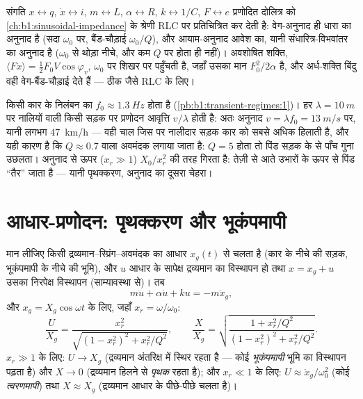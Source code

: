 \begin{remark}[दो अनुनाद, एक परिपथ]\label{rem:b1:oscillators-resonance:analogy}
संगति $x \leftrightarrow q$, $\dot x \leftrightarrow i$,
$m \leftrightarrow L$, $\alpha \leftrightarrow R$, $k \leftrightarrow 1/C$,
$F \leftrightarrow e$ प्रणोदित दोलित्र को \cref{ch:b1:sinusoidal-impedance}
के श्रेणी RLC पर प्रतिचित्रित कर देती है: वेग-अनुनाद ही धारा का अनुनाद है
(सदा $\omega_0$ पर, बैंड-चौड़ाई $\omega_0/Q$), और आयाम-अनुनाद आवेश का, यानी
संधारित्र-विभवांतर का अनुनाद है ($\omega_0$ से थोड़ा नीचे, और कम $Q$ पर
होता ही नहीं)। अवशोषित शक्ति, $\langle F\dot x\rangle
= \tfrac12 F_0V\cos\varphi_v$, $\omega_0$ पर शिखर पर पहुँचती है, जहाँ उसका मान
$F_0^2/2\alpha$ है, और अर्ध-शक्ति बिंदु वही वेग-बैंड-चौड़ाई देते हैं ---
ठीक जैसे RLC के लिए।
\end{remark}

\begin{example}[अनुनादी चालें]\label{ex:b1:oscillators-resonance:road}
किसी कार के निलंबन का $f_0 \approx \qty{1.3}{Hz}$ होता है (\cref{pb:b1:transient-regimes:1})।
हर $\lambda = \qty{10}{m}$ पर नालियों वाली किसी सड़क पर प्रणोदन आवृत्ति
$v/\lambda$ होती है: अतः अनुनाद $v = \lambda f_0 = \qty{13}{m/s}$ पर, यानी
लगभग \qty{47}{km/h} --- वही चाल जिस पर नालीदार सड़क कार को सबसे अधिक हिलाती
है, और यही कारण है कि $Q \approx 0.7$ वाला अवमंदक लगाया जाता है: $Q = 5$
होता तो पिंड सड़क के  से पाँच गुना उछलता। अनुनाद से ऊपर ($x_r \gg 1$)
 $X_0/x_r^2$ की तरह गिरता है: तेज़ी से आते उभारों के ऊपर से पिंड
``तैर'' जाता है --- यानी पृथक्करण, अनुनाद का दूसरा चेहरा।
\end{example}

\section{आधार-प्रणोदन: पृथक्करण और भूकंपमापी}

\begin{proposition}[अपने आधार से हिलाया गया दोलित्र]\label{prop:b1:oscillators-resonance:base}
मान लीजिए किसी द्रव्यमान--स्प्रिंग--अवमंदक का आधार $x_g(t)$ से चलता है
(कार के नीचे की सड़क, भूकंपमापी के नीचे की भूमि), और $u$ आधार के सापेक्ष
द्रव्यमान का विस्थापन हो तथा $x = x_g + u$ उसका निरपेक्ष विस्थापन
(साम्यावस्था से)। तब
\[
m\ddot u + \alpha\dot u + ku = -m\ddot x_g ,
\]
और $x_g = X_g\cos\omega t$ के लिए, जहाँ $x_r = \omega/\omega_0$:
\[
\frac{U}{X_g} = \frac{x_r^2}{\sqrt{(1 - x_r^2)^2 + x_r^2/Q^2}},
\qquad
\frac{X}{X_g} = \sqrt{\frac{1 + x_r^2/Q^2}{(1 - x_r^2)^2 + x_r^2/Q^2}} .
\]
$x_r \gg 1$ के लिए: $U \to X_g$ (द्रव्यमान अंतरिक्ष में स्थिर रहता है ---
कोई \emph{भूकंपमापी} भूमि का विस्थापन पढ़ता है) और $X \to 0$ (द्रव्यमान
हिलने से \emph{पृथक} रहता है); और $x_r \ll 1$ के लिए: $U \approx
\ddot x_g/\omega_0^2$ (कोई \emph{त्वरणमापी}) तथा $X \approx X_g$ (द्रव्यमान
आधार के पीछे-पीछे चलता है)।
\end{proposition}

